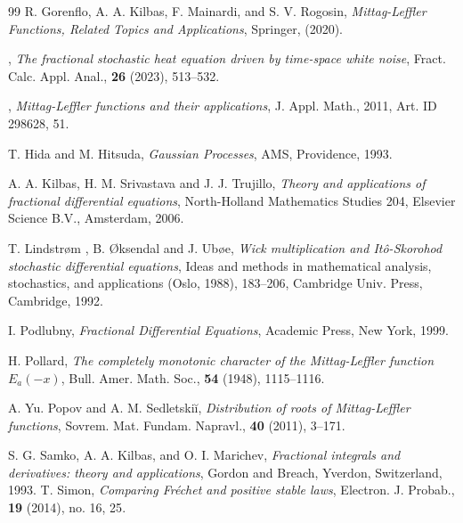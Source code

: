 \documentclass[12pt, reqno]{amsart}
\begin{document}
\begin{thebibliography}{99}
 R. Gorenflo, A. A. Kilbas, F. Mainardi, and S. V. Rogosin, {\em Mittag-Leffler Functions, Related Topics and Applications}, Springer, (2020).

, {\em The fractional stochastic heat equation driven by time-space               white noise}, {Fract. Calc. Appl. Anal.}, {\bf 26} (2023), {513--532}.

, {\em Mittag-{L}effler functions and their applications}, {J. Appl. Math.}, {2011}, {Art. ID 298628, 51}.

 T. Hida and M. Hitsuda, {\em Gaussian Processes}, AMS, Providence, 1993.

 A. A. Kilbas, H. M. Srivastava and J. J. Trujillo,
{\em Theory and applications of fractional differential equations},
North-Holland Mathematics Studies 204, Elsevier Science B.V., Amsterdam, 2006.

 {T. Lindstr\o m , B. \O ksendal and J. Ub\o e}, {\em Wick multiplication and {I}t\^o-{S}korohod stochastic             differential equations}, {Ideas and methods in mathematical analysis, stochastics, and              applications ({O}slo, 1988)}, {183--206}, {Cambridge Univ. Press, Cambridge}, {1992}.



 I. Podlubny,
{\em Fractional Differential Equations},
Academic Press, New York, 1999.


 {H. Pollard}, {\em The completely monotonic character of the {M}ittag-{L}effler
              function {$E_a(-x)$}}, {Bull. Amer. Math. Soc.}, {\bf 54} (1948), {1115--1116}.

 {A. Yu. Popov  and A. M. Sedletski\u i}, {\em Distribution of roots of {M}ittag-{L}effler functions}, {Sovrem. Mat. Fundam. Napravl.}, {\bf 40} (2011), {3--171}.

 S. G. Samko, A. A. Kilbas, and O. I. Marichev,
{\em Fractional integrals and derivatives: theory and applications},
Gordon and Breach, Yverdon, Switzerland, 1993.
 {T. Simon}, {\em Comparing {F}r\'echet and positive stable laws}, {Electron. J. Probab.}, {\bf 19} (2014), {no. 16, 25}.


\end{thebibliography}
\end{document}
